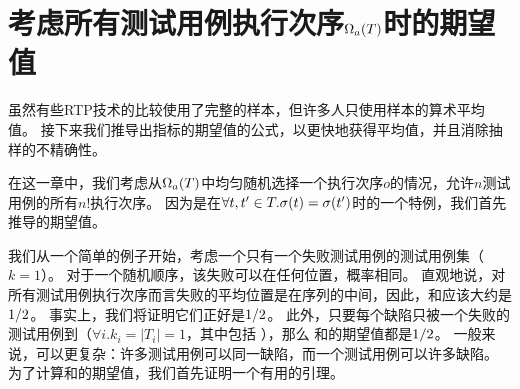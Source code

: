 \chapter{考虑所有测试用例执行次序$\Omega_a(T)$时的期望值}\label{section:expected}

虽然有些RTP技术的比较使用了完整的样本\distribution{}，但许多人只使用样本的算术平均值。
接下来我们推导出指标的期望值的公式，以更快地获得平均值，并且消除抽样的不精确性。
 
在这一章中，我们考虑从$\Omega_a(T)$中均匀随机选择一个执行次序$o$的情况，允许$n$测试用例的所有$n!$执行次序。
 因为\APFD{}是\APFDc{}在$\forall t,t'\in T.\sigma(t)=\sigma(t')$时的一个特例，我们首先推导\APFDc{}的期望值。
 
我们从一个简单的例子开始，考虑一个只有一个失败测试用例的测试用例集（$k=1$）。
对于一个随机顺序，该失败可以在任何位置，概率相同。
直观地说，对所有测试用例执行次序而言失败的平均位置是在序列的中间，因此，\APFD{}和\APFDc{}应该大约是$1/2$。
事实上，我们将证明它们正好是$1/2$。
此外，只要每个缺陷只被一个失败的测试用例\detect{}到（$\forall i.k_i=|T_i|=1$，其中包括 \mappingOneToOne{}），那么 \APFD{}和\APFDc{}的期望值都是$1/2$。
一般来说，\mappingMatrix{}可以更复杂：许多测试用例可以\detect{}同一缺陷，而一个测试用例可以\detect{}许多缺陷。
为了计算\APFD{}和\APFDc{}的期望值，我们首先证明一个有用的引理。

